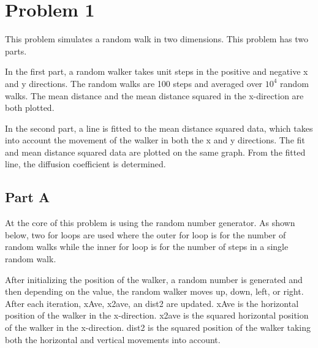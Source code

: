 \documentclass[12pt]{article}
\begin{document}
	
\section{Problem 1}

\noindent This problem simulates a random walk in two dimensions. This problem has two parts. \newline

\noindent In the first part, a random walker takes unit steps in the positive and negative x and y directions. The random walks are 100 steps and averaged over $10^4$ random walks. The mean distance and the mean distance squared in the x-direction are both plotted. \newline

\noindent In the second part, a line is fitted to the mean distance squared data, which takes into account the movement of the walker in both the x and y directions. The fit and mean distance squared data are plotted on the same graph. From the fitted line, the diffusion coefficient is determined.

\subsection{Part A}

\noindent At the core of this problem is using the random number generator. As shown below, two for loops are used where the outer for loop is for the number of random walks while the inner for loop is for the number of steps in a single random walk. \newline

\noindent After initializing the position of the walker, a random number is generated and then depending on the value, the random walker moves up, down, left, or right. After each iteration, xAve, x2ave, an dist2 are updated. xAve is the horizontal position of the walker in the x-direction. x2ave is the squared horizontal position of the walker in the x-direction. dist2 is the squared position of the walker taking both the horizontal and vertical movements into account. \newline
 
\end{document}
